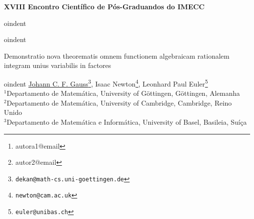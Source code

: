 \documentclass[a4paper, 12pt]{article}
\begin{document}
	\begin{center}
		\sc\large\textbf{XVIII Encontro Científico de Pós-Graduandos do IMECC}\\
		\vspace{-1em}
		
oindent \hrulefill\\	
		\vspace{-1.1em}
		
oindent \hrulefill\\
	\end{center}
	\begin{center}
		\Large{Demonstratio nova theorematis omnem functionem algebraicam rationalem integram unius variabilis in factores}
	\end{center}
	\author{
		{\large  Nome da Autora }\thanks{autora1@email}\\
		{\small Filiação da autora} \\
		{\large Nome do Autor }\thanks{autor2@email} \\
		{\small Filiação do autor } \\
	}
	
	
oindent {\small 
	\underline{Johann C. F. Gauss}\footnote{\texttt{dekan@math-cs.uni-goettingen.de}},
	Isaac Newton\footnote{\texttt{newton@cam.ac.uk}},
	Leonhard Paul Euler\footnote{\texttt{euler@unibas.ch}}}\\
	{\footnotesize
	$^{1}$Departamento de Matemática, University of G\"{o}ttingen, G\"{o}ttingen, Alemanha\\ 
	$^{2}$Departamento de Matemática, University of Cambridge, Cambridge, Reino Unido\\
	$^{3}$Departamento de Matemática e Informática, University of Basel, Basileia, Suíça}
	\begin{abstract}
	\lipsum[1]
	
	
oindent {\bf Palavras-chave}:   %
	\end{abstract}
\end{document}
